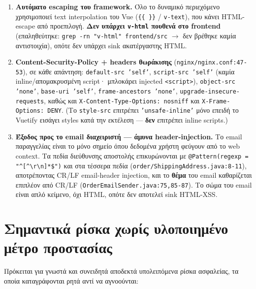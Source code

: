 \documentclass[11pt,a4paper]{article}
\newcommand{\code}[1]{\texttt{#1}}
\begin{document}
\begin{enumerate}[leftmargin=2em]\setlength\itemsep{3pt}
    \item \textbf{Αυτόματο escaping του framework.} Όλο το δυναμικό περιεχόμενο χρησιμοποιεί text
          interpolation του Vue (\code{\{\{ \}\}} / \code{v-text}), που κάνει HTML-escape από προεπιλογή.
          \textbf{Δεν υπάρχει \code{v-html} πουθενά στο frontend} (επαληθεύτηκε:
          \verb|grep -rn "v-html" frontend/src| $\rightarrow$ δεν βρέθηκε καμία αντιστοιχία), οπότε δεν υπάρχει sink
          ακατέργαστης HTML.
    \item \textbf{Content-Security-Policy + headers θωράκισης} (\code{nginx/nginx.conf:47-53}), σε κάθε
          απάντηση: \code{default-src 'self'}, \code{script-src 'self'} (καμία inline/απομακρυσμένη
          script· μπλοκάρει injected \code{<script>}), \code{object-src 'none'}, \code{base-uri 'self'},
          \code{frame-ancestors 'none'}, \code{upgrade-insecure-requests}, καθώς και
          \code{X-Content-Type-Options: nosniff} και \code{X-Frame-Options: DENY}. (Το \code{style-src}
          επιτρέπει \code{'unsafe-inline'} μόνο επειδή το Vuetify εισάγει styles κατά την εκτέλεση ---
          \textbf{δεν} επιτρέπει inline scripts.)
    \item \textbf{Έξοδος προς το email διαχειριστή --- άμυνα header-injection.} Το email παραγγελίας
          είναι το μόνο σημείο όπου δεδομένα χρήστη φεύγουν από το web context. Τα πεδία διεύθυνσης
          αποστολής επικυρώνονται με \verb|@Pattern(regexp = "^[^\r\n]*$")| και στα τέσσερα πεδία
          (\code{order/ShippingAddress.java:8-11}), αποτρέποντας CR/LF email-header injection, και το
          \textbf{θέμα} του email καθαρίζεται επιπλέον από CR/LF (\code{OrderEmailSender.java:75,85-87}).
          Το σώμα του email είναι απλό κείμενο, όχι HTML, οπότε δεν αποτελεί sink HTML-XSS.
\end{enumerate}

\section{Σημαντικά ρίσκα χωρίς υλοποιημένο μέτρο προστασίας}
\label{sec:risks}

Πρόκειται για γνωστά και συνειδητά αποδεκτά υπολειπόμενα ρίσκα ασφαλείας, τα οποία καταγράφονται ρητά αντί να αγνοούνται:
\end{document}
